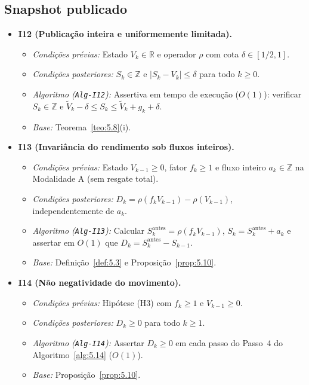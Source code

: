 \documentclass[11pt, a4paper]{article}
\theoremstyle{definition}
\theoremstyle{plain}
\theoremstyle{remark}
\begin{document}
\subsection{Snapshot publicado}

\begin{itemize}
    \item \textbf{I12 (Publicação inteira e uniformemente limitada).}
    \begin{itemize}
        \item \emph{Condições prévias:} Estado $V_k \in \mathbb{R}$ e operador $\rho$ com cota $\delta \in [1/2, 1]$.
        \item \emph{Condições posteriores:} $S_k \in \mathbb{Z}$ e $|S_k - V_k| \le \delta$ para todo $k \ge 0$.
        \item \emph{Algoritmo (\texttt{Alg-I12}):} Assertiva em tempo de execução ($O(1)$): verificar $S_k \in \mathbb{Z}$ e $\tilde{V}_k - \delta \le S_k \le \tilde{V}_k + g_k + \delta$.
        \item \emph{Base:} Teorema~\ref{teo:5.8}(i).
    \end{itemize}

    \item \textbf{I13 (Invariância do rendimento sob fluxos inteiros).}
    \begin{itemize}
        \item \emph{Condições prévias:} Estado $V_{k-1} \ge 0$, fator $f_k \ge 1$ e fluxo inteiro $a_k \in \mathbb{Z}$ na Modalidade A (sem resgate total).
        \item \emph{Condições posteriores:} $D_k = \rho(f_k V_{k-1}) - \rho(V_{k-1})$, independentemente de $a_k$.
        \item \emph{Algoritmo (\texttt{Alg-I13}):} Calcular $S_k^{\text{antes}} = \rho(f_k V_{k-1})$, $S_k = S_k^{\text{antes}} + a_k$ e assertar em $O(1)$ que $D_k = S_k^{\text{antes}} - S_{k-1}$.
        \item \emph{Base:} Definição~\ref{def:5.3} e Proposição~\ref{prop:5.10}.
    \end{itemize}

    \item \textbf{I14 (Não negatividade do movimento).}
    \begin{itemize}
        \item \emph{Condições prévias:} Hipótese (H3) com $f_k \ge 1$ e $V_{k-1} \ge 0$.
        \item \emph{Condições posteriores:} $D_k \ge 0$ para todo $k \ge 1$.
        \item \emph{Algoritmo (\texttt{Alg-I14}):} Assertar $D_k \ge 0$ em cada passo do Passo~4 do Algoritmo~\ref{alg:5.14} ($O(1)$).
        \item \emph{Base:} Proposição~\ref{prop:5.10}.
    \end{itemize}


\end{itemize}
\end{document}
